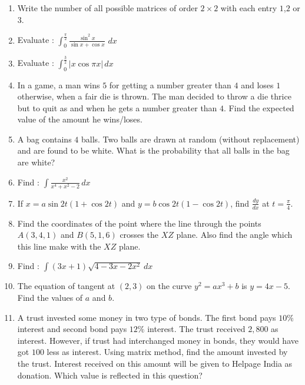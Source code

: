 \documentclass{article}
\begin{document}
\begin{enumerate}
\item  Write the number of all possible matrices of order $2\times2$ with each entry $1$,$2$ or $3$.
\item Evaluate : 
$\int_{0}^{\frac{\pi}{2}} \frac{\sin^2 x}{\sin x + \cos x}$ $dx$
\item Evaluate :
$\int_{0}^\frac{3}{2}\left| x \cos \pi x \right| \, dx$
\item In a game, a man wins \rupee $ 5$  for getting a number greater than $4$ and loses \rupee $ 1$ otherwise, when a fair die is thrown. The man decided to throw a die thrice but to quit as and when he gets a number greater than $4$. Find the expected value of the amount he wins/loses.
\item  A bag contains $4$ balls. Two balls are drawn at random (without replacement) and are found to be white. What is the probability that all balls in the bag are white?
\item Find :                                                      
$\int \frac{x^2}{x^4 + x^2 - 2} \, dx$   
\item If $ x=a \sin 2t (1 + \cos 2t)$ and $ y=b \cos 2t (1 - \cos 2t)$, find $\frac{dy}{dx}$ at $ t = \frac{\pi}{4}$.
\item Find the coordinates of the point where the line through the points $ A(3,4,1) $ and $B(5,1,6)$ crosses the $XZ$ plane. Also find the angle which this line make with the $XZ$ plane.
\item Find :
$\int (3x+1)\sqrt {4-3x-2x^2} \ dx$   
\item The equation of tangent at $(2,3)$ on the curve $y^2=ax^3+b$ is $y=4x-5$. Find the values of $a$ and $b$.            
\item A trust invested some money in two type of bonds. The first bond pays $10\%$ interest and second bond pays $12\%$ interest. The trust received  \rupee $2,800$ as interest. However, if trust had interchanged money in bonds, they would have got \rupee $100$ less as interest. Using matrix method, find the amount invested by the trust. Interest received on this amount will be given to Helpage India as donation. Which value is reflected in this question?
\end{enumerate}
\end{document}
